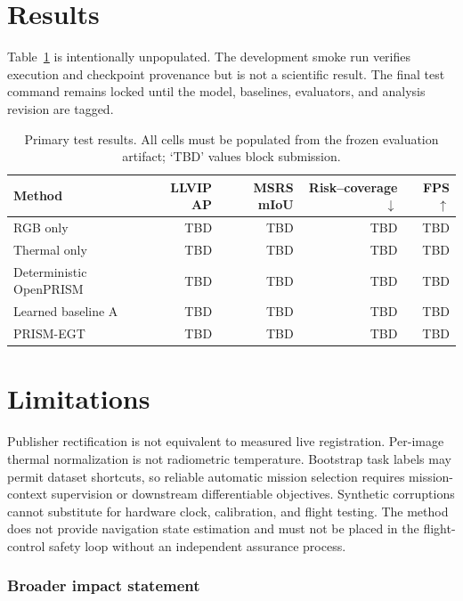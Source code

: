 \documentclass[10pt]{article}
\begin{document}
\section{Results}

Table~\ref{tab:results} is intentionally unpopulated. The development smoke run
verifies execution and checkpoint provenance but is not a scientific result.
The final test command remains locked until the model, baselines, evaluators,
and analysis revision are tagged.

\begin{table}[H]
\caption{Primary test results. All cells must be populated from the frozen
evaluation artifact; `TBD' values block submission.}
\label{tab:results}
\begin{center}
\begin{tabular}{lrrrr}
\toprule
Method & LLVIP AP & MSRS mIoU & Risk--coverage $\downarrow$ & FPS $\uparrow$ \\
\midrule
RGB only & TBD & TBD & TBD & TBD \\
Thermal only & TBD & TBD & TBD & TBD \\
Deterministic OpenPRISM & TBD & TBD & TBD & TBD \\
Learned baseline A & TBD & TBD & TBD & TBD \\
PRISM-EGT & TBD & TBD & TBD & TBD \\
\bottomrule
\end{tabular}
\end{center}
\end{table}

\section{Limitations}

Publisher rectification is not equivalent to measured live registration.
Per-image thermal normalization is not radiometric temperature. Bootstrap task
labels may permit dataset shortcuts, so reliable automatic mission selection
requires mission-context supervision or downstream differentiable objectives.
Synthetic corruptions cannot substitute for hardware clock, calibration, and
flight testing. The method does not provide navigation state estimation and
must not be placed in the flight-control safety loop without an independent
assurance process.

\subsubsection*{Broader impact statement}
\end{document}
